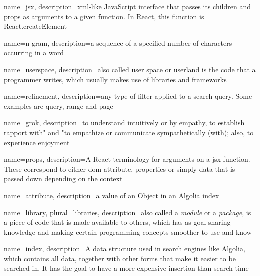 
{
  name=jsx,
  description={\acrshort{xml}-like JavaScript interface that passes its children and props as arguments to a given function. In React, this function is React.createElement}
}
 
{
  name={n-gram},
  description={a sequence of a specified number of characters occurring in a word\cite{kimbrell1988searching}~}
}
 
{
  name=userspace,
  description={also called user space or userland is the code that a programmer writes, which usually makes use of libraries and frameworks}
}

{
  name=refinement,
  description={any type of filter applied to a search query. Some examples are query, range and page}
}

{
  name=grok,
  description={to understand intuitively or by empathy, to establish rapport with" and "to empathize or communicate sympathetically (with); also, to experience enjoyment\cite{grok}~}
}

{
  name=props,
  description={A React terminology for arguments on a \gls{jsx} function. These correspond to either \acrshort{dom} attribute, properties or simply data that is passed down depending on the context}
}

{
  name=attribute,
  description={a value of an Object in an Algolia index}
}

{
  name=library,
  plural=libraries,
  description={also called a \emph{module} or a \emph{package}, is a piece of code that is made available to others, which has as goal sharing knowledge and making certain programming concepts smoother to use and know}
}

{
  name=index,
  description={A data structure used in search engines like Algolia, which contains all data, together with other forms that make it easier to be searched in. It has the goal to have a more expensive insertion than search time}
}

